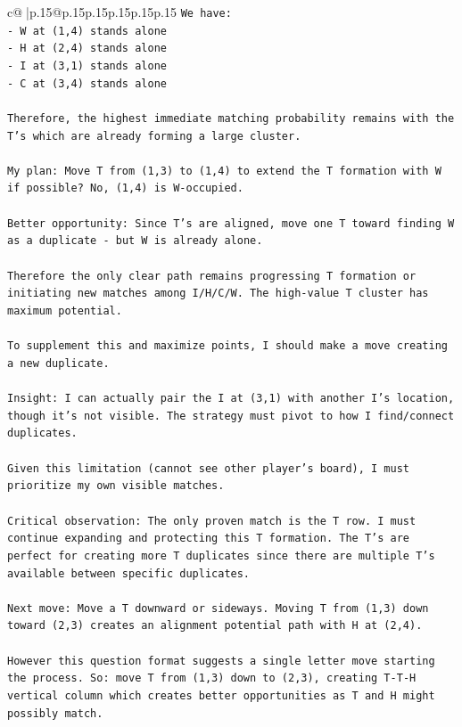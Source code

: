 \documentclass{article}
\begin{document}
{\begin{supertabular}{c@{$\;$}|p{.15\linewidth}@{}p{.15\linewidth}p{.15\linewidth}p{.15\linewidth}p{.15\linewidth}p{.15\linewidth}}
{{{\texttt{We have:} \\
\texttt{{-} W at (1,4) stands alone} \\
\texttt{{-} H at (2,4) stands alone} \\
\texttt{{-} I at (3,1) stands alone} \\
\texttt{{-} C at (3,4) stands alone} \\
\\ 
\texttt{Therefore, the highest immediate matching probability remains with the T's which are already forming a large cluster.} \\
\\ 
\texttt{My plan: Move T from (1,3) to (1,4) to extend the T formation with W if possible? No, (1,4) is W{-}occupied. } \\
\\ 
\texttt{Better opportunity: Since T's are aligned, move one T toward finding W as a duplicate {-} but W is already alone.} \\
\\ 
\texttt{Therefore the only clear path remains progressing T formation or initiating new matches among I/H/C/W. The high{-}value T cluster has maximum potential.} \\
\\ 
\texttt{To supplement this and maximize points, I should make a move creating a new duplicate.} \\
\\ 
\texttt{Insight: I can actually pair the I at (3,1) with another I's location, though it's not visible. The strategy must pivot to how I find/connect duplicates.} \\
\\ 
\texttt{Given this limitation (cannot see other player's board), I must prioritize my own visible matches.} \\
\\ 
\texttt{Critical observation: The only proven match is the T row. I must continue expanding and protecting this T formation. The T's are perfect for creating more T duplicates since there are multiple T's available between specific duplicates.} \\
\\ 
\texttt{Next move: Move a T downward or sideways. Moving T from (1,3) down toward (2,3) creates an alignment potential path with H at (2,4).} \\
\\ 
\texttt{However this question format suggests a single letter move starting the process. So: move T from (1,3) down to (2,3), creating T{-}T{-}H vertical column which creates better opportunities as T and H might possibly match.} \\
}}}
\end{supertabular}}
\end{document}
